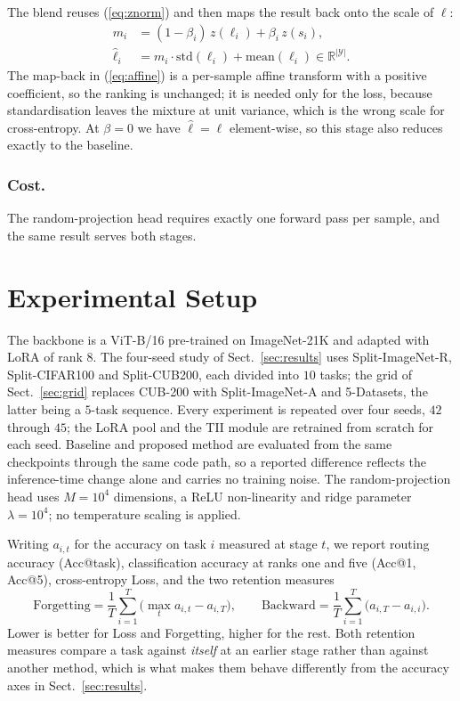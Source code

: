 \documentclass[runningheads]{llncs}
\begin{document}
The blend reuses (\ref{eq:znorm}) and then maps the result back onto the scale of
$\ell$:
\begin{align}
m_i &= (1 - \beta_i)\, z(\ell_i) + \beta_i\, z(s_i),
\label{eq:mix}\\
\hat{\ell}_i &= m_i \cdot \mathrm{std}(\ell_i) + \mathrm{mean}(\ell_i)
   \in \mathbb{R}^{|\mathcal{Y}|}.
\label{eq:affine}
\end{align}
The map-back in (\ref{eq:affine}) is a per-sample affine transform with a
positive coefficient, so the ranking is unchanged; it is needed only for the loss,
because standardisation leaves the mixture at unit variance, which is the wrong
scale for cross-entropy. At $\beta = 0$ we have $\hat{\ell} = \ell$
element-wise, so this stage also reduces exactly to the baseline.

\subsubsection{Cost.}
The random-projection head requires exactly one forward pass per sample, and the
same result serves both stages.

\section{Experimental Setup}
\label{sec:setup}

The backbone is a ViT-B/16 pre-trained on ImageNet-21K and adapted with LoRA of
rank $8$. The four-seed study of Sect.~\ref{sec:results} uses Split-ImageNet-R,
Split-CIFAR100 and Split-CUB200, each divided into $10$ tasks; the grid of
Sect.~\ref{sec:grid} replaces CUB-200 with Split-ImageNet-A and 5-Datasets, the
latter being a $5$-task sequence. Every experiment is repeated over four seeds,
$42$ through $45$; the LoRA pool and the TII module are retrained from scratch
for each seed. Baseline and proposed
method are evaluated from the same checkpoints through the same code path, so a
reported difference reflects the inference-time change alone and carries no
training noise. The random-projection head uses $M = 10^4$ dimensions, a ReLU
non-linearity and ridge parameter $\lambda = 10^4$; no temperature scaling is
applied.

Writing $a_{i,t}$ for the accuracy on task $i$ measured at stage $t$, we report
routing accuracy (Acc@task), classification accuracy at ranks one and five
(Acc@1, Acc@5), cross-entropy Loss, and the two retention measures
\begin{equation}
\mathrm{Forgetting} = \frac{1}{T}\sum_{i=1}^{T}
\Big( \max_{t} a_{i,t} - a_{i,T} \Big),
\qquad
\mathrm{Backward} = \frac{1}{T}\sum_{i=1}^{T} \big( a_{i,T} - a_{i,i} \big).
\label{eq:metrics}
\end{equation}
Lower is better for Loss and Forgetting, higher for the rest. Both retention
measures compare a task against \emph{itself} at an earlier stage rather than
against another method, which is what makes them behave differently from the
accuracy axes in Sect.~\ref{sec:results}.
\end{document}
